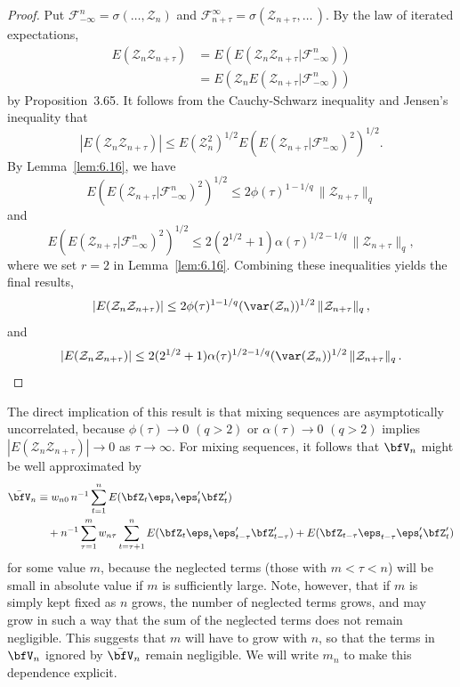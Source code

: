 \begin{proof}
Put $\mathcal{F}_{-\infty}^n = \sigma(\ldots,\mathcal{Z}_n)$ and $\mathcal{F}_{n+\tau}^\infty = \sigma(\mathcal{Z}_{n+\tau},\ldots\,)$. By the law of iterated expectations,
\begin{align*}
  E(\mathcal{Z}_n\mathcal{Z}_{n+\tau}) &= E(E(\mathcal{Z}_n\mathcal{Z}_{n+\tau}|\mathcal{F}_{-\infty}^n)) \\
    &= E(\mathcal{Z}_n E(\mathcal{Z}_{n+\tau}|\mathcal{F}_{-\infty}^n))
\end{align*}
by Proposition~3.65. It follows from the Cauchy-Schwarz inequality and Jensen's inequality that
\[
  |E(\mathcal{Z}_n\mathcal{Z}_{n+\tau})| \leq E(\mathcal{Z}_n^2)^{1/2}E(E(\mathcal{Z}_{n+\tau}|\mathcal{F}_{-\infty}^n)^2)^{1/2}.
\]
By Lemma~\ref{lem:6.16}, we have
\[
  E(E(\mathcal{Z}_{n+\tau}|\mathcal{F}_{-\infty}^n)^2)^{1/2} \leq 2\phi(\tau)^{1-1/q}\,\|\mathcal{Z}_{n+\tau}\|_q
\]
and
\[
  E(E(\mathcal{Z}_{n+\tau}|\mathcal{F}_{-\infty}^n)^2)^{1/2} \leq 2(2^{1/2}+1)\alpha(\tau)^{1/2-1/q}\,\|\mathcal{Z}_{n+\tau}\|_q,
\]
where we set $r = 2$ in Lemma~\ref{lem:6.16}. Combining these inequalities yields the final results,
\[
  |E(\mathcal{Z}_n\mathcal{Z}_{n+\tau})| \leq 2\phi(\tau)^{1-1/q}(\var(\mathcal{Z}_n))^{1/2}\,\|\mathcal{Z}_{n+\tau}\|_q\,,
\]
and
\[
  |E(\mathcal{Z}_n\mathcal{Z}_{n+\tau})| \leq 2(2^{1/2}+1)\alpha(\tau)^{1/2-1/q}(\var(\mathcal{Z}_n))^{1/2}\,\|\mathcal{Z}_{n+\tau}\|_q\,.
\]
\end{proof}

The direct implication of this result is that mixing sequences are asymptotically uncorrelated, because $\phi(\tau) \to 0$ $(q > 2)$ or $\alpha(\tau) \to 0$ $(q > 2)$ implies $|E(\mathcal{Z}_n\mathcal{Z}_{n+\tau})| \to 0$ as $\tau \to \infty$. For mixing sequences, it follows that $\bfV_n$ might be well approximated by
\begin{align*}
  \bar{\bfV}_n &\equiv w_{n0}\, n^{-1}\sum_{t=1}^{n}E(\bfZ_t\eps_t\eps_t'\bfZ_t') \\
    &\quad + n^{-1}\sum_{\tau=1}^{m}w_{n\tau}\sum_{t=\tau+1}^{n}E(\bfZ_t\eps_t\eps_{t-\tau}'\bfZ_{t-\tau}') + E(\bfZ_{t-\tau}\eps_{t-\tau}\eps_t'\bfZ_t')
\end{align*}
for some value $m$, because the neglected terms (those with $m < \tau < n$) will be small in absolute value if $m$ is sufficiently large. Note, however, that if $m$ is simply kept fixed as $n$ grows, the number of neglected terms grows, and may grow in such a way that the sum of the neglected terms does not remain negligible. This suggests that $m$ will have to grow with $n$, so that the terms in $\bfV_n$ ignored by $\bar{\bfV}_n$ remain negligible. We will write $m_n$ to make this dependence explicit.

